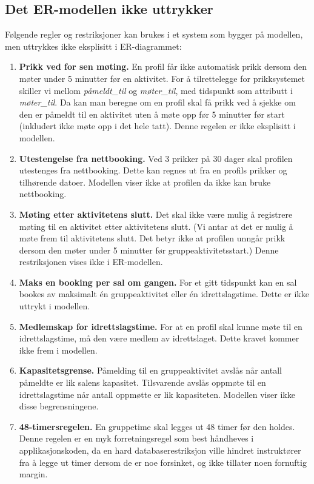 \subsection{Det ER-modellen ikke uttrykker}

Følgende regler og restriksjoner kan brukes i et system som bygger på modellen, men uttrykkes ikke eksplisitt i ER-diagrammet:

\begin{enumerate}
    \item \textbf{Prikk ved for sen møting.} En profil får ikke automatisk prikk dersom den møter under 5 minutter før en aktivitet. For å tilrettelegge for prikksystemet skiller
     vi mellom \textit{påmeldt\_til} og \textit{møter\_til}, med tidspunkt som attributt i \textit{møter\_til}. Da kan man beregne om en profil
      skal få prikk ved å sjekke om den er påmeldt til en aktivitet uten å møte opp før 5 minutter før start (inkludert ikke møte opp i det hele tatt). 
      Denne regelen er ikke eksplisitt i modellen.
    \item \textbf{Utestengelse fra nettbooking.} Ved 3 prikker på 30 dager skal profilen utestenges fra nettbooking. Dette kan regnes ut fra en
     profils prikker og tilhørende datoer. Modellen viser ikke at profilen da ikke kan bruke nettbooking.
    \item \textbf{Møting etter aktivitetens slutt.} Det skal ikke være mulig å registrere møting til en aktivitet etter aktivitetens slutt.
     (Vi antar at det er mulig å møte frem til aktivitetens slutt. Det betyr ikke at profilen unngår prikk dersom den møter under 5 minutter
      før gruppeaktivitetsstart.) Denne restriksjonen vises ikke i ER-modellen.
    \item \textbf{Maks en booking per sal om gangen.} For et gitt tidspunkt kan en sal bookes av maksimalt én gruppeaktivitet eller én idrettslagstime. Dette er ikke uttrykt i modellen.
    \item \textbf{Medlemskap for idrettslagstime.} For at en profil skal kunne møte til en idrettslagstime, må den være medlem av idrettslaget. Dette kravet kommer ikke frem i modellen.
    \item \textbf{Kapasitetsgrense.} Påmelding til en gruppeaktivitet avslås når antall påmeldte er lik salens kapasitet. Tilsvarende avslås oppmøte til en idrettslagstime når antall oppmøtte er lik kapasiteten. Modellen viser ikke disse begrensningene.
    \item \textbf{48-timersregelen.} En gruppetime skal legges ut 48 timer før den holdes. Denne regelen er en myk forretningsregel som best håndheves i applikasjonskoden, da en hard databaserestriksjon ville hindret instruktører fra å legge ut timer dersom de er noe forsinket, og ikke tillater noen fornuftig margin.
\end{enumerate}
